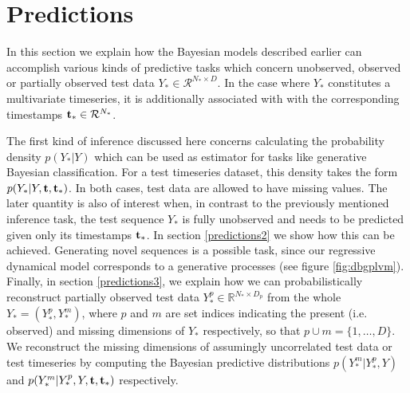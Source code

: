 \documentclass [10pt , a4paper]{article}
\begin{document}
\section{Predictions \label{section:predictions}} 

%


In this section we explain how the Bayesian models described earlier can accomplish various kinds of predictive tasks which
 concern unobserved, observed or partially observed test data  $Y_* \in \mathcal{R}^{N_* \times D}$.  
In the case where $Y_*$ constitutes a multivariate timeseries, it is additionally associated with with the corresponding timestamps
$\mathbf{t}_* \in \mathcal{R}^{N_*}$.

\par The first kind of inference discussed here concerns calculating the probability density
 $p(Y_*|Y)$ which can be used as estimator for tasks like generative Bayesian classification. For a test timeseries dataset,
  this density takes the form $p(Y_*|Y,\mathbf{t},\mathbf{t}_*)$. In both cases, test data are allowed to have missing values.
  The later quantity is also of interest when, in contrast to the previously mentioned inference task,
the test sequence $Y_*$ is fully unobserved and needs to be predicted  given only its timestamps $\mathbf{t}_*$.
 In section \ref{predictions2} we show how this can be achieved.
 Generating novel sequences is a possible task, since our regressive dynamical model corresponds to a
 generative processes (see figure \ref{fig:dbgplvm}).  
 Finally, in section \ref{predictions3}, we explain how we can probabilistically reconstruct 
 partially observed test data  $Y_*^{p} \in \mathbb{R}^{N_* \times D_p}$ from the whole $Y_*
= (Y_*^{p}, Y_*^{m})$, where $p$ and $m$ are set indices indicating
the present (i.e. observed) and missing dimensions of $Y_*$
respectively, so that $p \cup m= \{1,\ldots,D\}$.
 We reconstruct the
missing dimensions of assumingly uncorrelated test data or test timeseries by computing the
 Bayesian predictive distributions $p(Y_*^{m}| Y_*^{p}, Y)$ and $p(Y_*^{m}| Y_*^{p}, Y, \mathbf{t}, \mathbf{t}_*)$ respectively.
\end{document}
